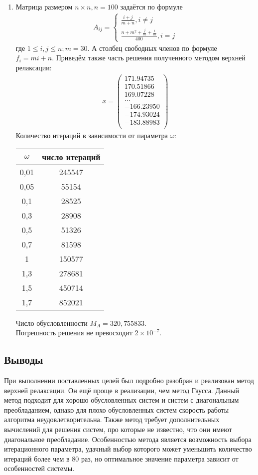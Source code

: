 \documentclass[a4paper,12pt,titlepage,finall]{article}
\begin{document}
\begin{enumerate}
\item
Матрица размером $n \times n, n = 100$ задаётся по формуле
\begin{align}
A_{ij} = \left\{
\begin{array}{ll}
\frac{i+j}{m+n}, i \neq j\\
\frac{n + m^2 + \frac{j}{m} + \frac{i}{m}}{400}, i = j
\end{array}
\right.
\end{align}
где $1 \leq i,j \leq n; m = 30$. А столбец свободных членов по формуле $f_i = mi + n$. Приведём также часть решения полученного методом верхней релаксации:
\begin{align*}
x = \begin{pmatrix}
171.94735 \\
 170.51866 \\
 169.07228 \\
   ...\\
 -166.23950 \\
-174.93024 \\
-183.88983 \\  
\end{pmatrix}
\end{align*}
Количество итераций в зависимости от параметра $\omega$:
\begin{center}
\begin{tabular}{|c|c|}
\hline
$\omega$ & число итераций\\
\hline
0,01 & 245547\\
0,05 & 55154\\
0,1 & 28525\\
0,3 & 28908\\
0,5 & 51326\\
0,7 & 81598\\
 1 & 150577\\
 1,3 & 278681\\
 1,5 & 450714\\
 1,7 & 852021\\
 \hline
\end{tabular}
\end{center}

Число обусловленности $M_A = 320,755833$.\\
Погрешность решения не превосходит $2 \times 10^{-7}$.
\end{enumerate}

\subsection{Выводы}
При выполнении поставленных целей был подробно разобран и реализован метод верхней релаксации. Он ещё проще в реализации, чем метод Гаусса. Данный метод подходит для хорошо обусловленных систем и систем с диагональным преобладанием, однако для плохо обусловленных систем скорость работы алгоритма неудовлетворительна. Также метод требует дополнительных вычислений для решения систем, про которые не известно, что они имеют диагональное преобладание. Особенностью метода является возможность выбора итерационного параметра, удачный выбор которого может уменьшить количество итераций более чем в $80$ раз, но оптимальное значение параметра зависит от особенностей системы.
\end{document}
